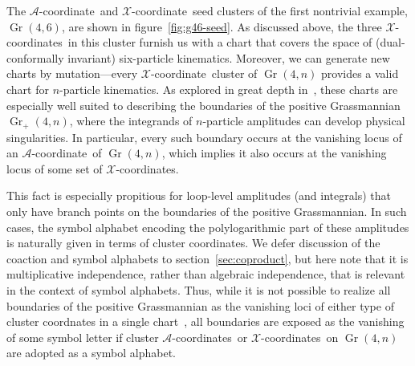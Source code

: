 \documentclass[11pt]{article}
\DeclareMathOperator{\Gr}{Gr}
\def\xcoord{$\mathcal{X}$-coordinate}
\def\xcoords{$\mathcal{X}$-coordinates}
\def\acoord{$\mathcal{A}$-coordinate}
\def\acoords{$\mathcal{A}$-coordinates}
\begin{document}
The \acoord\ and \xcoord\ seed clusters of the first nontrivial example, $\Gr(4,6)$, are shown in figure~\ref{fig:g46-seed}. As discussed above, the three \xcoords\ in this cluster furnish us with a chart that covers the space of (dual-conformally invariant) six-particle kinematics. Moreover, we can generate new charts by mutation---every \xcoord\ cluster of $\Gr(4,n)$ provides a valid chart for $n$-particle kinematics. As explored in great depth in~\cite{ArkaniHamed:2012nw}, these charts are especially well suited to describing the boundaries of the positive Grassmannian $\Gr_+(4,n)$, where the integrands of $n$-particle amplitudes can develop physical singularities. In particular, every such boundary occurs at the vanishing locus of an \acoord\ of $\Gr(4,n)$, which implies it also occurs at the vanishing locus of some set of \xcoords.  

This fact is especially propitious for loop-level amplitudes (and integrals) that only have branch points on the boundaries of the positive Grassmannian. In such cases, the symbol alphabet encoding the polylogarithmic part of these amplitudes is naturally given in terms of cluster coordinates. We defer discussion of the coaction and symbol alphabets to section~\ref{sec:coproduct}, but here note that it is multiplicative independence, rather than algebraic independence, that is relevant in the context of symbol alphabets. Thus, while it is not possible to realize all boundaries of the positive Grassmannian as the vanishing loci of either type of cluster coordnates in a single chart~\cite{ArkaniHamed:2012nw}, all boundaries are exposed as the vanishing of some symbol letter if cluster \acoords\ or \xcoords\ on $\Gr(4,n)$ are adopted as a symbol alphabet.
\end{document}
